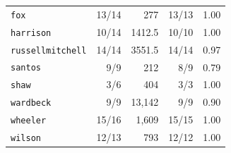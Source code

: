\begin{table}[t]
{\begin{tabular}{lrrrr}
\texttt{fox} & 13/14 & 277 & 13/13 & 1.00 \\
\texttt{harrison} & 10/14 & 1412.5 & 10/10 & 1.00 \\
\texttt{russellmitchell} & 14/14 & 3551.5 & 14/14 & 0.97 \\
\texttt{santos} & 9/9 & 212 & 8/9 & 0.79 \\
\texttt{shaw} & 3/6 & 404 & 3/3 & 1.00 \\
\texttt{wardbeck} & 9/9 & 13{,}142 & 9/9 & 0.90 \\
\texttt{wheeler} & 15/16 & 1{,}609 & 15/15 & 1.00 \\
\texttt{wilson} & 12/13 & 793 & 12/12 & 1.00 \\
\bottomrule
\end{tabular}}
\end{table}
